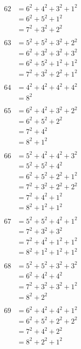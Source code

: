 \documentclass{article}
\numberwithin{equation}{section}
\begin{document}
\begin{multicols}{3}
\noindent
\begin{align*}
62 & = 6^2 + 4^2 + 3^2 + 1^2\\
   & = 6^2 + 5^2 + 1^2\\
   & = 7^2 + 3^2 + 2^2\\
\\
63 & = 5^2 + 5^2 + 3^2 + 2^2\\
   & = 6^2 + 3^2 + 3^2 + 3^2\\
   & = 6^2 + 5^2 + 1^2 + 1^2\\
   & = 7^2 + 3^2 + 2^2 + 1^2\\
\\
64 & = 4^2 + 4^2 + 4^2 + 4^2\\
   & = 8^2\\
\\
65 & = 6^2 + 4^2 + 3^2 + 2^2\\
   & = 6^2 + 5^2 + 2^2\\
   & = 7^2 + 4^2\\
   & = 8^2 + 1^2\\
\\
66 & = 5^2 + 4^2 + 4^2 + 3^2\\
   & = 5^2 + 5^2 + 4^2\\
   & = 6^2 + 5^2 + 2^2 + 1^2\\
   & = 7^2 + 3^2 + 2^2 + 2^2\\
   & = 7^2 + 4^2 + 1^2\\
   & = 8^2 + 1^2 + 1^2\\
\\
67 & = 5^2 + 5^2 + 4^2 + 1^2\\
   & = 7^2 + 3^2 + 3^2\\
   & = 7^2 + 4^2 + 1^2 + 1^2\\
   & = 8^2 + 1^2 + 1^2 + 1^2\\
\\
68 & = 5^2 + 5^2 + 3^2 + 3^2\\
   & = 6^2 + 4^2 + 4^2\\
   & = 7^2 + 3^2 + 3^2 + 1^2\\
   & = 8^2 + 2^2\\
\end{align*}
\vspace{\fill}\columnbreak
\begin{align*}
69 & = 6^2 + 4^2 + 4^2 + 1^2\\
   & = 6^2 + 5^2 + 2^2 + 2^2\\
   & = 7^2 + 4^2 + 2^2\\
   & = 8^2 + 2^2 + 1^2\\

\end{align*}
\end{multicols}
\end{document}
